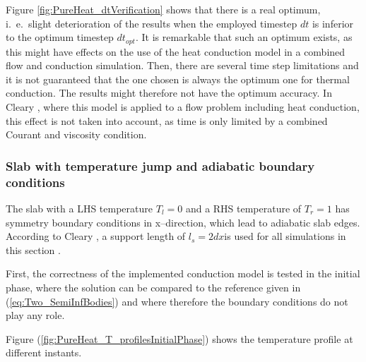 \documentclass[11pt,a4paper,twoside]{report}
\begin{document}
Figure \ref{fig:PureHeat_dtVerification} shows that there is a real optimum, i.\ e.\ slight deterioration of the results when the employed timestep $dt$ is inferior to the optimum timestep $dt_\mathit{opt}$. %
It is remarkable that such an optimum exists, as this might have effects on the use of the heat conduction model in a combined flow and conduction simulation. Then, there are several time step limitations and it is not guaranteed that the one chosen is always the optimum one for thermal conduction. The results might therefore not have the optimum accuracy. In Cleary \cite{Cleary2002}, where this model is applied to a flow problem including heat conduction, this effect is not taken into account, as time is only limited by a combined Courant and viscosity condition.


\subsubsection{Slab with temperature jump and adiabatic boundary conditions}
\label{sec:Results_PureHeat_adiabaticBC}

The slab with a LHS temperature $T_l=0$ and a RHS temperature of $T_r=1$ has symmetry boundary conditions in x--direction, which lead to adiabatic slab edges.
According to Cleary \cite{Cleary1999}, a support length of $l_s=2dx$is used for all simulations in this section .

First, the correctness of the implemented conduction model is tested in the initial phase, where the solution can be compared to the reference given in (\ref{eq:Two_SemiInfBodies}) and where therefore the boundary conditions do not play any role.

Figure (\ref{fig:PureHeat_T_profilesInitialPhase}) shows the temperature profile at different instants.
\end{document}
